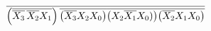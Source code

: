 \documentclass[preview]{standalone}
\begin{document}
\begin{align*}
\overline{\left(\overline{\overline{X_3}\nobreak\hspace{.16667em plus .08333em}\overline{X_2}X_1}\right)\overline{\left(\overline{X_3}X_2X_0\right)}\overline{\left(X_2\overline{X_1}X_0)\right)}\overline{\left(\overline{X_2}X_1X_0\right)}}
\end{align*}
\end{document}
